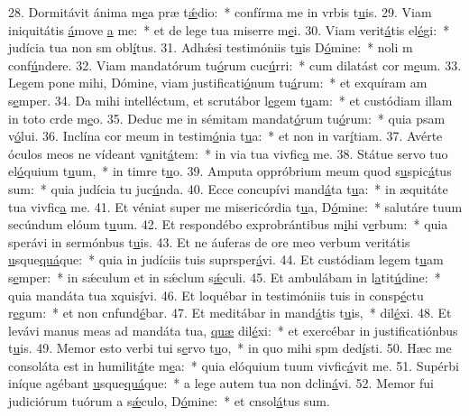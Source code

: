 28. Dormitávit ánima m\uline{e}a præ t\uline{ǽ}dio:~* confírma me in vrbis t\uline{u}is.
29. Viam iniquitátis \uline{á}move \uline{a} me:~* et de lege tua miserre m\uline{e}i.
30. Viam verit\uline{á}tis el\uline{é}gi:~* judícia tua non sm obl\uline{í}tus.
31. Adhǽsi testimóniis t\uline{u}is D\uline{ó}mine:~* noli m conf\uline{ú}ndere.
32. Viam mandatórum tu\uline{ó}rum cuc\uline{ú}rri:~* cum dilatást cor m\uline{e}um.
33. Legem pone mihi, Dómine, viam justificati\uline{ó}num tu\uline{á}rum:~* et exquíram am s\uline{e}mper.
34. Da mihi intelléctum, et scrutábor l\uline{e}gem t\uline{u}am:~* et custódiam illam in toto crde m\uline{e}o.
35. Deduc me in sémitam mandat\uline{ó}rum tu\uline{ó}rum:~* quia psam v\uline{ó}lui.
36. Inclína cor meum in testim\uline{ó}nia t\uline{u}a:~* et non in var\uline{í}tiam.
37. Avérte óculos meos ne vídeant v\uline{a}nit\uline{á}tem:~* in via tua vivfic\uline{a} me.
38. Státue servo tuo el\uline{ó}quium t\uline{u}um,~* in timre t\uline{u}o.
39. Amputa oppróbrium meum quod s\uline{u}spic\uline{á}tus sum:~* quia judícia tu juc\uline{ú}nda.
40. Ecce concupívi mand\uline{á}ta t\uline{u}a:~* in æquitáte tua vivfic\uline{a} me.
41. Et véniat super me misericórdia t\uline{u}a, D\uline{ó}mine:~* salutáre tuum secúndum elóum t\uline{u}um.
42. Et respondébo exprobrántibus m\uline{i}hi v\uline{e}rbum:~* quia sperávi in sermónbus t\uline{u}is.
43. Et ne áuferas de ore meo verbum veritátis \uline{u}sque\uline{quá}que:~* quia in judíciis tuis suprsper\uline{á}vi.
44. Et custódiam legem t\uline{u}am s\uline{e}mper:~* in sǽculum et in sǽclum s\uline{ǽ}culi.
45. Et ambulábam in l\uline{a}tit\uline{ú}dine:~* quia mandáta tua xquis\uline{í}vi.
46. Et loquébar in testimóniis tuis in consp\uline{é}ctu r\uline{e}gum:~* et non cnfund\uline{é}bar.
47. Et meditábar in mand\uline{á}tis t\uline{u}is,~*  dil\uline{é}xi.
48. Et levávi manus meas ad mandáta tua, \uline{quæ} dil\uline{é}xi:~* et exercébar in justificatiónbus t\uline{u}is.
49. Memor esto verbi tui s\uline{e}rvo t\uline{u}o,~* in quo mihi spm ded\uline{í}sti.
50. Hæc me consoláta est in humilit\uline{á}te m\uline{e}a:~* quia elóquium tuum vivfic\uline{á}vit me.
51. Supérbi iníque agébant \uline{u}sque\uline{quá}que:~* a lege autem tua non dclin\uline{á}vi.
52. Memor fui judiciórum tuórum a s\uline{ǽ}culo, D\uline{ó}mine:~* et cnsol\uline{á}tus sum.
